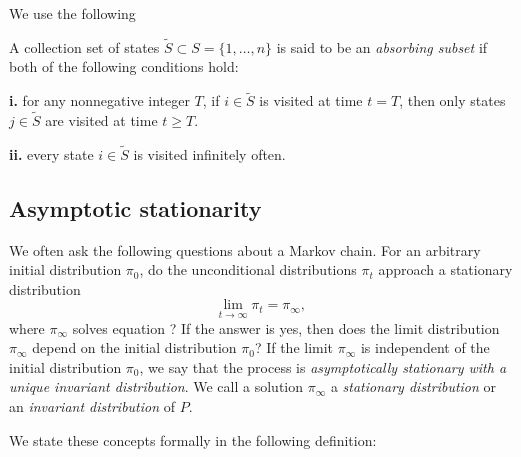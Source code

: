 We use the following

\medskip
{} A collection set of states $\tilde S \subset S = \{1, \ldots, n\}$ is said to be
an {\it absorbing subset\/} if both of the following conditions hold:
\item{{\bf i.}} for any nonnegative integer $T$,
if $i \in \tilde S$ is visited at time $t=T$, then only states $j \in \tilde S$ are visited at time $t \geq T$.%
\item{{\bf ii.}} every state $i \in \tilde S $ is visited infinitely often.
\enddefinition


\subsection{Asymptotic stationarity}

   We often ask the following questions
about a    Markov chain. For an arbitrary initial distribution
$\pi_0$, do the unconditional distributions
$\pi_t$ approach a stationary distribution
$$ \lim_{t \to \infty} \pi_t = \pi_\infty ,$$
where $\pi_\infty$ solves equation
 ?  If the answer is yes, then does the
limit distribution $\pi_\infty$ depend on the initial distribution
$\pi_0$?  If the limit $\pi_\infty$ is independent of the
initial distribution $\pi_0$, we say that the process is
{\it asymptotically stationary with a unique invariant distribution}.
We call a solution $\pi_\infty$ a {\it stationary
distribution\/} or an {\it invariant distribution\/} of $P$.


  We state these concepts formally in the following definition:

